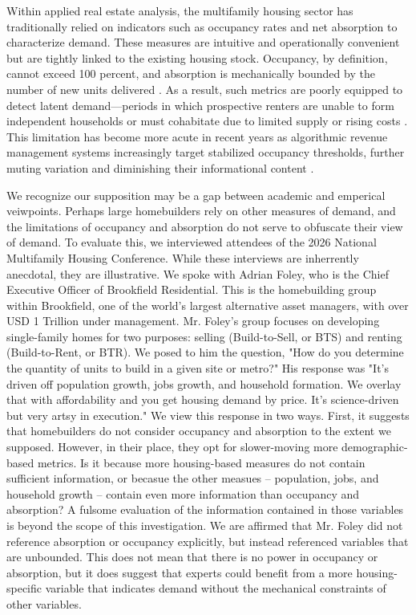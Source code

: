 \documentclass[pdflatex,sn-basic]{sn-jnl}%
\theoremstyle{thmstyleone}%
\theoremstyle{thmstyletwo}%
\theoremstyle{thmstylethree}%
\begin{document}
Within applied real estate analysis, the multifamily housing sector has traditionally
relied on indicators such as occupancy rates and net absorption to characterize demand.
These measures are intuitive and operationally convenient but are tightly linked to the
existing housing stock. Occupancy, by definition, cannot exceed 100 percent, and
absorption is mechanically bounded by the number of new units delivered
\cite{mueller1999real, gabriel2001rental}. As a result, such metrics are poorly equipped
to detect latent demand—periods in which prospective renters are unable to form
independent households or must cohabitate due to limited supply or rising costs
\cite{sirmans1991determinants, pyhrr1999real}. This limitation has become more acute in
recent years as algorithmic revenue management systems increasingly target stabilized
occupancy thresholds, further muting variation and diminishing their informational
content \cite{calder2024coordinated}.

We recognize our supposition may be a gap between academic and emperical veiwpoints. Perhaps large homebuilders rely on other measures of demand, and the limitations of occupancy and absorption do not serve to obfuscate their view of demand. 
To evaluate this, we interviewed attendees of the 2026 National Multifamily Housing Conference. While these interviews are inherrently anecdotal, they are illustrative. We spoke with Adrian Foley, who is the Chief Executive Officer of Brookfield Residential. This is the homebuilding group within Brookfield, one of the world's largest alternative asset managers, with over USD 1 Trillion under management. Mr. Foley's group focuses on developing single-family homes for two purposes: selling (Build-to-Sell, or BTS) and renting (Build-to-Rent, or BTR). We posed to him the question, "How do you determine the quantity of units to build in a given site or metro?" His response was "It's driven off population growth, jobs growth, and household formation. We overlay that with affordability and you get housing demand by price.  It's science-driven but very artsy in execution." We view this response in two ways. First, it suggests that homebuilders do not consider occupancy and absorption to the extent we supposed. However, in their place, they opt for slower-moving more demographic-based metrics. Is it because more housing-based measures do not contain sufficient information, or becasue the other measues -- population, jobs, and household growth -- contain even more information than occupancy and absorption? A fulsome evaluation of the information contained in those variables is beyond the scope of this investigation. 
We are affirmed that Mr. Foley did not reference absorption or occupancy explicitly, but instead referenced variables that are unbounded. This does not mean that there is no power in occupancy or absorption, but it does suggest that experts could benefit from a more housing-specific variable that indicates demand without the mechanical constraints of other variables. 
\end{document}

